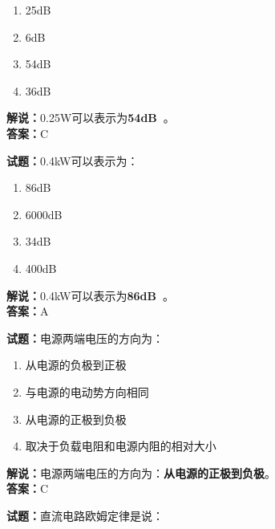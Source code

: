 \documentclass{ctexbook}
\begin{document}
\begin{enumerate}[leftmargin=3em]
	\item 25\unit[qualifier-mode=combine]{\deci\bel{}}
	\item 6\unit[qualifier-mode=combine]{\deci\bel{}}
	\item 54\unit[qualifier-mode=combine]{\deci\bel{}}
	\item 36\unit[qualifier-mode=combine]{\deci\bel{}}
\end{enumerate}

\noindent\textbf{解说：}0.25W可以表示为\textbf{54\unit[qualifier-mode=combine]{\deci\bel{}}}。\\\noindent\textbf{答案：}C



\bigskip


\noindent\textbf{试题：}0.4kW可以表示为：

\begin{enumerate}[leftmargin=3em]
	\item 86\unit[qualifier-mode=combine]{\deci\bel{}}
	\item 6000\unit[qualifier-mode=combine]{\deci\bel{}}
	\item 34\unit[qualifier-mode=combine]{\deci\bel{}}
	\item 400\unit[qualifier-mode=combine]{\deci\bel{}}
\end{enumerate}

\noindent\textbf{解说：}0.4kW可以表示为\textbf{86\unit[qualifier-mode=combine]{\deci\bel{}}}。\\\noindent\textbf{答案：}A



\bigskip


\noindent\textbf{试题：}电源两端电压的方向为：

\begin{enumerate}[leftmargin=3em]
	\item 从电源的负极到正极
	\item 与电源的电动势方向相同
	\item 从电源的正极到负极
	\item 取决于负载电阻和电源内阻的相对大小
\end{enumerate}

\noindent\textbf{解说：}电源两端电压的方向为：\textbf{从电源的正极到负极}。\\\noindent\textbf{答案：}C


\bigskip


\noindent\textbf{试题：}直流电路欧姆定律是说：
\end{document}
